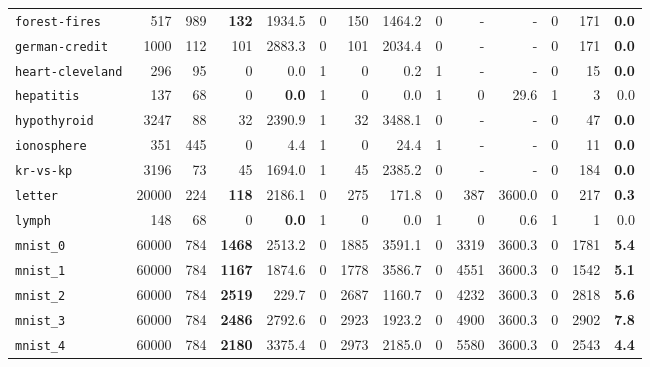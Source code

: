 \begin{tabular}{lccrrrrrrrrrrr}
\texttt{forest-fires} & \multicolumn{1}{r}{517} & \multicolumn{1}{r}{989}  & \textbf{132} & 1934.5 & 0 & 150 & 1464.2 & 0 & - & - & 0 & 171 & \textbf{0.0}\\
\texttt{german-credit} & \multicolumn{1}{r}{1000} & \multicolumn{1}{r}{112}  & 101 & 2883.3 & 0 & 101 & 2034.4 & 0 & - & - & 0 & 171 & \textbf{0.0}\\
\texttt{heart-cleveland} & \multicolumn{1}{r}{296} & \multicolumn{1}{r}{95}  & 0 & 0.0 & 1 & 0 & 0.2 & 1 & - & - & 0 & 15 & \textbf{0.0}\\
\texttt{hepatitis} & \multicolumn{1}{r}{137} & \multicolumn{1}{r}{68}  & 0 & \textbf{0.0} & 1 & 0 & 0.0 & 1 & 0 & 29.6 & 1 & 3 & 0.0\\
\texttt{hypothyroid} & \multicolumn{1}{r}{3247} & \multicolumn{1}{r}{88}  & 32 & 2390.9 & 1 & 32 & 3488.1 & 0 & - & - & 0 & 47 & \textbf{0.0}\\
\texttt{ionosphere} & \multicolumn{1}{r}{351} & \multicolumn{1}{r}{445}  & 0 & 4.4 & 1 & 0 & 24.4 & 1 & - & - & 0 & 11 & \textbf{0.0}\\
\texttt{kr-vs-kp} & \multicolumn{1}{r}{3196} & \multicolumn{1}{r}{73}  & 45 & 1694.0 & 1 & 45 & 2385.2 & 0 & - & - & 0 & 184 & \textbf{0.0}\\
\texttt{letter} & \multicolumn{1}{r}{20000} & \multicolumn{1}{r}{224}  & \textbf{118} & 2186.1 & 0 & 275 & 171.8 & 0 & 387 & 3600.0 & 0 & 217 & \textbf{0.3}\\
\texttt{lymph} & \multicolumn{1}{r}{148} & \multicolumn{1}{r}{68}  & 0 & \textbf{0.0} & 1 & 0 & 0.0 & 1 & 0 & 0.6 & 1 & 1 & 0.0\\
\texttt{mnist\_0} & \multicolumn{1}{r}{60000} & \multicolumn{1}{r}{784}  & \textbf{1468} & 2513.2 & 0 & 1885 & 3591.1 & 0 & 3319 & 3600.3 & 0 & 1781 & \textbf{5.4}\\
\texttt{mnist\_1} & \multicolumn{1}{r}{60000} & \multicolumn{1}{r}{784}  & \textbf{1167} & 1874.6 & 0 & 1778 & 3586.7 & 0 & 4551 & 3600.3 & 0 & 1542 & \textbf{5.1}\\
\texttt{mnist\_2} & \multicolumn{1}{r}{60000} & \multicolumn{1}{r}{784}  & \textbf{2519} & 229.7 & 0 & 2687 & 1160.7 & 0 & 4232 & 3600.3 & 0 & 2818 & \textbf{5.6}\\
\texttt{mnist\_3} & \multicolumn{1}{r}{60000} & \multicolumn{1}{r}{784}  & \textbf{2486} & 2792.6 & 0 & 2923 & 1923.2 & 0 & 4900 & 3600.3 & 0 & 2902 & \textbf{7.8}\\
\texttt{mnist\_4} & \multicolumn{1}{r}{60000} & \multicolumn{1}{r}{784}  & \textbf{2180} & 3375.4 & 0 & 2973 & 2185.0 & 0 & 5580 & 3600.3 & 0 & 2543 & \textbf{4.4}\\

\end{tabular}
